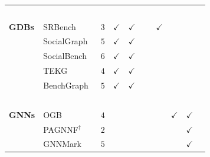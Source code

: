 \begin{landscape}
\begin{table}[htbp]
{\begin{tabular}{ll|cccccccc}
                { ~              }  & { ~                                       }      &      ~     &       ~       &       ~       &       ~       &        ~       &       ~       &      ~       &               \\
                { \textbf{GDBs}  }  & { SRBench~\cite{Zhang2012}                }      &    $3$       & $\checkmark$  & $\checkmark$  &               & $\checkmark$   &               &              &               \\
                { ~              }  & { SocialGraph~\cite{Angles2013}           }      &    $5$       & $\checkmark$  & $\checkmark$  &               &                &               &              &               \\
                { ~              }  & { SocialBench~\cite{Erling2015}           }      &    $6$       & $\checkmark$  & $\checkmark$  &               &                &               &              &               \\
                { ~              }  & { TEKG~\cite{Mcnight2021}           }            &    $4$       & $\checkmark$  & $\checkmark$  &               &                &               &              &               \\
                { ~              }  & { BenchGraph~\cite{Javor2022,Javor2023}   }      &    $5$       & $\checkmark$  & $\checkmark$  &               &                &               &              &               \\
                { ~              }  & { ~                                       }      &      ~     &       ~       &       ~       &       ~       &        ~       &       ~       &      ~       &               \\
                { \textbf{GNNs}  }  & { OGB~\cite{Hu2020}                       }      &    $4$       &               &               &               &                & $\checkmark$  & $\checkmark$ &               \\
                { ~              }  & { PAGNNF${^\dagger}$~\cite{Wu2021a}          }   &    $2$       &               &               &               &                &               & $\checkmark$ &               \\
                { ~              }  & { GNNMark~\cite{Baruah2021}               }      &    $5$       &               &               &               &                &               & $\checkmark$ &               \\

\end{tabular}}
\end{table}
\end{landscape}
